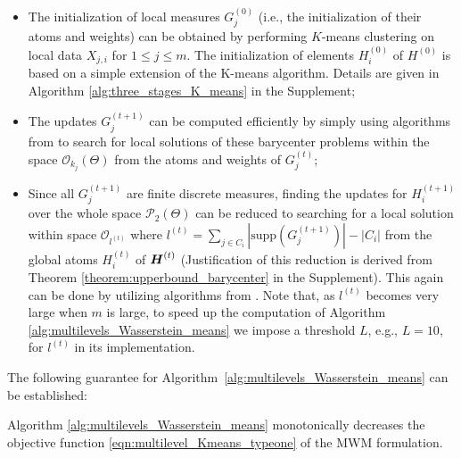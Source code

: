 \begin{itemize}
\item The initialization of local measures $G_{j}^{(0)}$ (i.e., the initialization of their atoms and weights) can be 
obtained by performing $K$-means clustering on local data $X_{j,i}$ for $1 \leq j \leq m$.
The initialization of elements $H_{i}^{(0)}$ of $H^{(0)}$ is based on 
a simple extension of the K-means algorithm. Details are given in Algorithm \ref{alg:three_stages_K_means} in the Supplement;
\item The updates $G_{j}
^{(t+1)}$ can be computed efficiently by simply using algorithms from \cite{Cuturi-2014} 
to search for local solutions of these barycenter problems within the space $\mathcal{O}
_{k_{j}}(\Theta)$ from the atoms and weights of 
$G_{j}^{(t)}$; 
\item Since all $G_{j}^{(t+1)}$ are finite discrete 
measures, finding the updates for $H_{i}^{(t+1)}$ over the whole space $\mathcal{P}_{2}
(\Theta)$ can be reduced to searching for a local solution within space $\mathcal{O}
_{l^{(t)}}$ where $l^{(t)}=\sum \limits_{j \in C_{i}}{|\text{supp}(G_{j}^{(t+1)})|}-|C_{i}|$ from the global atoms $H_{i}^{(t)}$ of $\boldsymbol{H}^{(t)}$
(Justification of this reduction is derived from Theorem \ref{theorem:upperbound_barycenter} in the Supplement). 
This again can be done by utilizing algorithms from \cite{Cuturi-2014}. Note that, as $l^{(t)}$ becomes very large when $m$ is large, to speed up the computation of Algorithm 
\ref{alg:multilevels_Wasserstein_means} we impose a threshold $L$, e.g., $L=10$, for 
$l^{(t)}$ in its implementation. 
\end{itemize}
The following guarantee for Algorithm~\ref{alg:multilevels_Wasserstein_means}
can be established:
\begin{theorem}\label{theorem:local_convergence_multilevel_Kmeans}
Algorithm \ref{alg:multilevels_Wasserstein_means} monotonically decreases the objective 
function \eqref{eqn:multilevel_Kmeans_typeone} of the MWM formulation.
\end{theorem}
